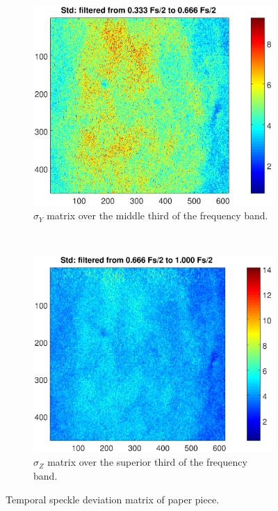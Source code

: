 \documentclass[review]{elsarticle}
\begin{document}
\begin{figure}[h!]
\begin{subfigure}[b]{0.465\textwidth}
        \label{fig:papelstd_stdx}
    \end{subfigure}
    ~\\ 
    \begin{subfigure}[b]{0.475\textwidth}
        \includegraphics[width=\textwidth]{stdy.eps}
	\caption{$\sigma_Y$ matrix over the middle third of the frequency band.}
        \label{fig:papelstd_stdy}
    \end{subfigure}
  ~
    \begin{subfigure}[b]{0.475\textwidth}
        \includegraphics[width=\textwidth]{stdz.eps}
	\caption{$\sigma_Z$ matrix over the superior third of the frequency band.}
        \label{fig:papelstd_stdz}
    \end{subfigure}
    
    \caption{Temporal speckle deviation matrix of paper piece.}
    \label{fig:papelstd}
\end{figure}
\end{document}
